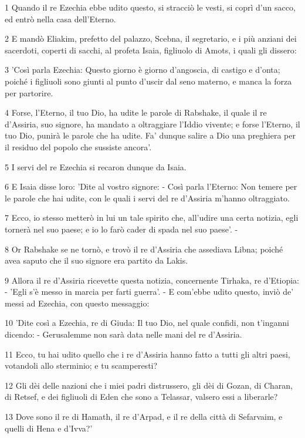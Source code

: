 \par 1 Quando il re Ezechia ebbe udito questo, si stracciò le vesti, si coprì d'un sacco, ed entrò nella casa dell'Eterno.
\par 2 E mandò Eliakim, prefetto del palazzo, Scebna, il segretario, e i più anziani dei sacerdoti, coperti di sacchi, al profeta Isaia, figliuolo di Amots, i quali gli dissero:
\par 3 'Così parla Ezechia: Questo giorno è giorno d'angoscia, di castigo e d'onta; poiché i figliuoli sono giunti al punto d'uscir dal seno materno, e manca la forza per partorire.
\par 4 Forse, l'Eterno, il tuo Dio, ha udite le parole di Rabshake, il quale il re d'Assiria, suo signore, ha mandato a oltraggiare l'Iddio vivente; e forse l'Eterno, il tuo Dio, punirà le parole che ha udite. Fa' dunque salire a Dio una preghiera per il residuo del popolo che sussiste ancora'.
\par 5 I servi del re Ezechia si recaron dunque da Isaia.
\par 6 E Isaia disse loro: 'Dite al vostro signore: - Così parla l'Eterno: Non temere per le parole che hai udite, con le quali i servi del re d'Assiria m'hanno oltraggiato.
\par 7 Ecco, io stesso metterò in lui un tale spirito che, all'udire una certa notizia, egli tornerà nel suo paese; e io lo farò cader di spada nel suo paese'. -
\par 8 Or Rabshake se ne tornò, e trovò il re d'Assiria che assediava Libna; poiché avea saputo che il suo signore era partito da Lakis.
\par 9 Allora il re d'Assiria ricevette questa notizia, concernente Tirhaka, re d'Etiopia: - 'Egli s'è messo in marcia per farti guerra'. - E com'ebbe udito questo, inviò de' messi ad Ezechia, con questo messaggio:
\par 10 'Dite così a Ezechia, re di Giuda: Il tuo Dio, nel quale confidi, non t'inganni dicendo: - Gerusalemme non sarà data nelle mani del re d'Assiria.
\par 11 Ecco, tu hai udito quello che i re d'Assiria hanno fatto a tutti gli altri paesi, votandoli allo sterminio; e tu scamperesti?
\par 12 Gli dèi delle nazioni che i miei padri distrussero, gli dèi di Gozan, di Charan, di Retsef, e dei figliuoli di Eden che sono a Telassar, valsero essi a liberarle?
\par 13 Dove sono il re di Hamath, il re d'Arpad, e il re della città di Sefarvaim, e quelli di Hena e d'Ivva?'
